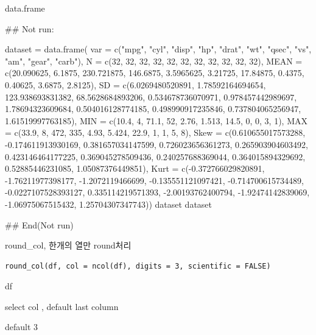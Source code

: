 \documentclass[a4paper]{book}
\begin{document}
%
\begin{Value}
data.frame
\end{Value}
%
\begin{Examples}
\begin{ExampleCode}

\#\# Not run: 

dataset = data.frame(
var = c("mpg", "cyl", "disp", "hp",
"drat", "wt", "qsec", "vs", "am",
"gear", "carb"),
N = c(32, 32, 32, 32, 32, 32, 32,
 32, 32, 32, 32),
MEAN = c(20.090625, 6.1875, 230.721875,
 146.6875, 3.5965625, 3.21725, 17.84875,
 0.4375, 0.40625, 3.6875, 2.8125),
SD = c(6.0269480520891, 1.78592164694654,
 123.938693831382, 68.5628684893206,
  0.534678736070971, 0.978457442989697,
  1.78694323609684, 0.504016128774185,
   0.498990917235846, 0.737804065256947,
    1.61519997763185),
MIN = c(10.4, 4, 71.1, 52, 2.76,
1.513, 14.5, 0, 0, 3, 1),
MAX = c(33.9, 8, 472, 335, 4.93,
5.424, 22.9, 1, 1, 5, 8),
Skew = c(0.610655017573288, -0.174611913930169,
 0.381657034147599, 0.726023656361273,
 0.265903904603492, 0.423146464177225,
 0.369045278509436, 0.240257688369044,
  0.364015894329692, 0.52885446231085, 1.05087376449851),
Kurt = c(-0.372766029820891, -1.76211977398177,
 -1.2072119466699, -0.135551121097421,
 -0.714700615734489, -0.0227107528393127,
 0.335114219571393, -2.00193762400794,
 -1.92474142839069, -1.06975067515432,
  1.25704307347743))
dataset
dataset%



## End(Not run)


\end{ExampleCode}
\end{Examples}
%
\begin{Description}
round\_col, 한개의 열만 round처리
\end{Description}
%
\begin{Usage}
\begin{verbatim}
round_col(df, col = ncol(df), digits = 3, scientific = FALSE)
\end{verbatim}
\end{Usage}
%
\begin{Arguments}
\begin{ldescription}
\item[\code{df}] df

\item[\code{col}] select col , default last column

\item[\code{digits}] default 3
\end{ldescription}
\end{Arguments}
\end{document}
